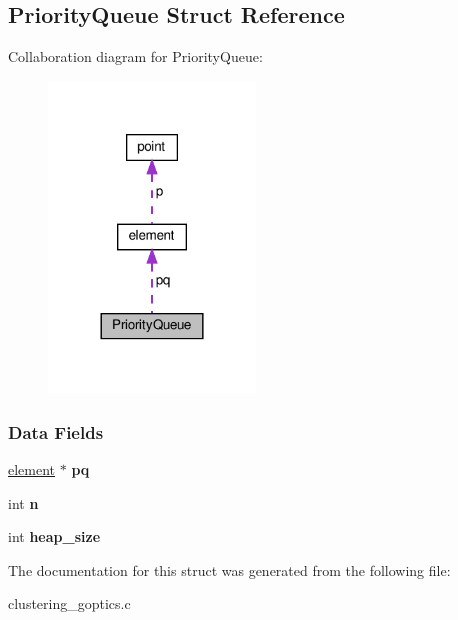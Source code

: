 \hypertarget{structPriorityQueue}{}\subsection{Priority\+Queue Struct Reference}
\label{structPriorityQueue}


Collaboration diagram for Priority\+Queue\+:\nopagebreak
\begin{figure}[H]
\begin{center}
\leavevmode
\includegraphics[width=156pt]{structPriorityQueue__coll__graph}
\end{center}
\end{figure}
\subsubsection*{Data Fields}
\begin{DoxyCompactItemize}
\item 
\mbox{\label{structPriorityQueue_a9541f287cf1a4feaa9862f340d265c7a}} 
\hyperlink{structelement}{element} $\ast$ {\bfseries pq}
\item 
\mbox{\label{structPriorityQueue_ad3b9a7dbcd73abb046b17dc5647ad5a7}} 
int {\bfseries n}
\item 
\mbox{\label{structPriorityQueue_ac23c7a9940c29e1e6706c9ba26faaa35}} 
int {\bfseries heap\+\_\+size}
\end{DoxyCompactItemize}


The documentation for this struct was generated from the following file\+:\begin{DoxyCompactItemize}
\item 
clustering\+\_\+goptics.\+c\end{DoxyCompactItemize}
